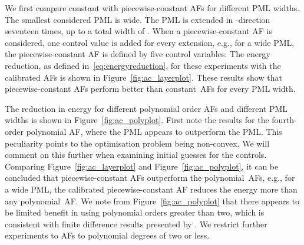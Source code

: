 \documentclass[a4paper]{article}
\begin{document}
We first compare constant with piecewise-constant AFs for different
PML widths. The smallest considered PML is  wide. The PML
is extended  in -direction seventeen times, up to a
total width of . When a piecewise-constant AF is
considered, one control value is added for every extension, e.g., for
a  wide PML, the piecewise-constant AF is defined by five
control variables. The energy reduction, as defined
in~\eqref{eq:energyreduction}, for these experiments with the
calibrated AFs is shown in Figure~\ref{fig:ac_layerplot}. These
results show that piecewise-constant AFs perform better than
constant~AFs for every PML width.

The reduction in energy for different polynomial order AFs and
different PML widths is shown in Figure~\ref{fig:ac_polyplot}.  First
note the results for the fourth-order polynomial AF, where the
 PML appears to outperform the  PML. This
peculiarity points to the optimisation problem being non-convex. We
will comment on this further when examining initial guesses for the
controls.  Comparing Figure~\ref{fig:ac_layerplot} and
Figure~\ref{fig:ac_polyplot}, it can be concluded that
piecewise-constant AFs outperform the polynomial~AFs, e.g., for a
 wide PML, the calibrated piecewise-constant AF reduces
the energy more than any polynomial~AF. We note from
Figure~\ref{fig:ac_polyplot} that there appears to be limited benefit
in using polynomial orders greater than two, which is consistent with
finite difference results presented by \citet{chew96jin}. We restrict
further experiments to AFs to polynomial degrees of two or less.
\end{document}
